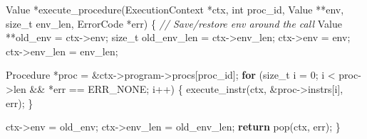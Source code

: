 \documentclass[]{article}
\newenvironment{Shaded}{}{}
\newcommand{\CommentTok}[1]{\textcolor[rgb]{0.38,0.63,0.69}{\textit{#1}}}
\newcommand{\ControlFlowTok}[1]{\textcolor[rgb]{0.00,0.44,0.13}{\textbf{#1}}}
\newcommand{\DataTypeTok}[1]{\textcolor[rgb]{0.56,0.13,0.00}{#1}}
\newcommand{\DecValTok}[1]{\textcolor[rgb]{0.25,0.63,0.44}{#1}}
\newcommand{\NormalTok}[1]{#1}
\newcommand{\OperatorTok}[1]{\textcolor[rgb]{0.40,0.40,0.40}{#1}}
\begin{document}
\begin{Shaded}
\begin{Highlighting}[]
\NormalTok{Value }\OperatorTok{*}\NormalTok{execute\_procedure}\OperatorTok{(}\NormalTok{ExecutionContext }\OperatorTok{*}\NormalTok{ctx}\OperatorTok{,} \DataTypeTok{int}\NormalTok{ proc\_id}\OperatorTok{,}
\NormalTok{                         Value }\OperatorTok{**}\NormalTok{env}\OperatorTok{,} \DataTypeTok{size\_t}\NormalTok{ env\_len}\OperatorTok{,}\NormalTok{ ErrorCode }\OperatorTok{*}\NormalTok{err}\OperatorTok{)} \OperatorTok{\{}
    \CommentTok{// Save/restore env around the call}
\NormalTok{    Value }\OperatorTok{**}\NormalTok{old\_env }\OperatorTok{=}\NormalTok{ ctx}\OperatorTok{{-}\textgreater{}}\NormalTok{env}\OperatorTok{;}
    \DataTypeTok{size\_t}\NormalTok{ old\_env\_len }\OperatorTok{=}\NormalTok{ ctx}\OperatorTok{{-}\textgreater{}}\NormalTok{env\_len}\OperatorTok{;}
\NormalTok{    ctx}\OperatorTok{{-}\textgreater{}}\NormalTok{env }\OperatorTok{=}\NormalTok{ env}\OperatorTok{;}
\NormalTok{    ctx}\OperatorTok{{-}\textgreater{}}\NormalTok{env\_len }\OperatorTok{=}\NormalTok{ env\_len}\OperatorTok{;}

\NormalTok{    Procedure }\OperatorTok{*}\NormalTok{proc }\OperatorTok{=} \OperatorTok{\&}\NormalTok{ctx}\OperatorTok{{-}\textgreater{}}\NormalTok{program}\OperatorTok{{-}\textgreater{}}\NormalTok{procs}\OperatorTok{[}\NormalTok{proc\_id}\OperatorTok{];}
    \ControlFlowTok{for} \OperatorTok{(}\DataTypeTok{size\_t}\NormalTok{ i }\OperatorTok{=} \DecValTok{0}\OperatorTok{;}\NormalTok{ i }\OperatorTok{\textless{}}\NormalTok{ proc}\OperatorTok{{-}\textgreater{}}\NormalTok{len }\OperatorTok{\&\&} \OperatorTok{*}\NormalTok{err }\OperatorTok{==}\NormalTok{ ERR\_NONE}\OperatorTok{;}\NormalTok{ i}\OperatorTok{++)} \OperatorTok{\{}
\NormalTok{        execute\_instr}\OperatorTok{(}\NormalTok{ctx}\OperatorTok{,} \OperatorTok{\&}\NormalTok{proc}\OperatorTok{{-}\textgreater{}}\NormalTok{instrs}\OperatorTok{[}\NormalTok{i}\OperatorTok{],}\NormalTok{ err}\OperatorTok{);}
    \OperatorTok{\}}

\NormalTok{    ctx}\OperatorTok{{-}\textgreater{}}\NormalTok{env }\OperatorTok{=}\NormalTok{ old\_env}\OperatorTok{;}
\NormalTok{    ctx}\OperatorTok{{-}\textgreater{}}\NormalTok{env\_len }\OperatorTok{=}\NormalTok{ old\_env\_len}\OperatorTok{;}
    \ControlFlowTok{return}\NormalTok{ pop}\OperatorTok{(}\NormalTok{ctx}\OperatorTok{,}\NormalTok{ err}\OperatorTok{);}
\OperatorTok{\}}
\end{Highlighting}
\end{Shaded}
\end{document}
